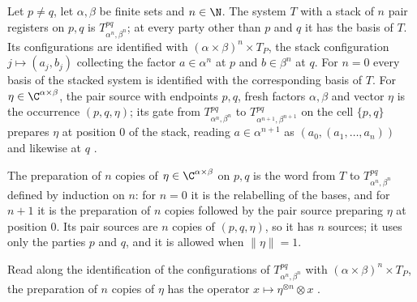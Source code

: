 \begin{definition}
    \label{def:party_stack_system}
    \leanok
    Let $p\ne q$, let $\alpha,\beta$ be finite sets and $n\in\N$. The system $T$ with
    a stack of $n$ pair registers on $p,q$ is $T^{pq}_{\alpha^n,\beta^n}$; at every
    party other than $p$ and $q$ it has the basis of $T$. Its configurations are
    identified with $(\alpha\times\beta)^n\times T_P$, the stack configuration
    $j\mapsto(a_j,b_j)$ collecting the factor $a\in\alpha^n$ at $p$ and
    $b\in\beta^n$ at $q$. For $n=0$ every basis of the stacked system is identified
    with the corresponding basis of $T$. For $\eta\in\C^{\alpha\times\beta}$, the
    pair source with endpoints $p,q$, fresh factors $\alpha,\beta$ and vector $\eta$
    is the occurrence $(p,q,\eta)$; its gate from $T^{pq}_{\alpha^n,\beta^n}$ to
    $T^{pq}_{\alpha^{n+1},\beta^{n+1}}$ on the cell $\{p,q\}$ prepares $\eta$ at
    position $0$ of the stack, reading $a\in\alpha^{n+1}$ as
    $(a_0,(a_1,\dots,a_n))$ and likewise at $q$ \cite[Lemma~5.1]{OpenAI2026PolynomialPEPS}.
\end{definition}

\begin{definition}
    \label{def:party_prep_word}
    \leanok
    The preparation of $n$ copies of $\eta\in\C^{\alpha\times\beta}$ on $p,q$ is the
    word from $T$ to $T^{pq}_{\alpha^n,\beta^n}$ defined by induction on $n$: for
    $n=0$ it is the relabelling of the bases, and for $n+1$ it is the preparation of
    $n$ copies followed by the pair source preparing $\eta$ at position $0$. Its pair
    sources are $n$ copies of $(p,q,\eta)$, so it has $n$ sources; it uses only the
    parties $p$ and $q$, and it is allowed when $\lVert\eta\rVert=1$.
\end{definition}

\begin{theorem}
    \label{thm:party_op_prep_word}
    \leanok
    Read along the identification of the configurations of
    $T^{pq}_{\alpha^n,\beta^n}$ with $(\alpha\times\beta)^n\times T_P$, the
    preparation of $n$ copies of $\eta$ has the operator
    $x\mapsto\eta^{\otimes n}\otimes x$
    \cite[Lemma~5.1]{OpenAI2026PolynomialPEPS}.
\end{theorem}

